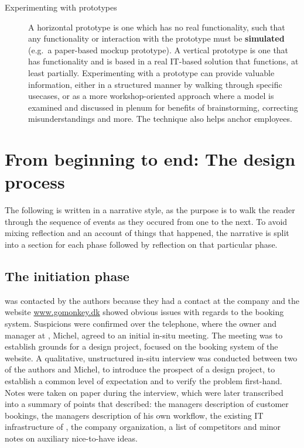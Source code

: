 \begin{description}
    \item [Experimenting with prototypes] A horizontal
        prototype\cite{bodker2004participatory} is one which has no real
        functionality, such that any functionality or interaction with the
        prototype must be \textbf{simulated} (e.g.\ a paper-based mockup
        prototype). A vertical prototype\cite{bodker2004participatory} is one
        that has functionality and is based in a real IT-based solution that
        functions, at least partially. Experimenting with a prototype can
        provide valuable information, either in a structured manner by walking
        through specific usecases, or as a more workshop-oriented approach where
        a model is examined and discussed in plenum for benefits of
        brainstorming, correcting misunderstandings and more. The technique also
        helps anchor employees.
\end{description}

\section{From beginning to end: The design process} \label{sec:process}
The following is written in a narrative style, as the purpose is to
walk the reader through the sequence of events as they occured from one
to the next. To avoid mixing reflection and an account of things that happened,
the narrative is split into a section for each phase followed by reflection on
that particular phase.

\subsection{The initiation phase}
\gomonkey{} was contacted by the authors because they had a contact at the
company and the website \url{www.gomonkey.dk} showed obvious issues with
regards to the booking system. Suspicions were confirmed over the telephone,
where the owner and manager at \gomonkey{}, Michel, agreed to an initial in-situ
meeting. The meeting was to establish grounds for a design project, focused on
the booking system of the \gomonkey{} website. A qualitative, unstructured
in-situ interview was conducted between two of the authors and Michel, to
introduce the prospect of a design project, to establish a common level of
expectation and to verify the problem first-hand. Notes were taken on paper
during the interview, which were later transcribed into a summary of points that
described: the managers description of customer bookings, the managers
description of his own workflow, the existing IT infrastructure of \gomonkey{},
the company organization, a list of competitors and minor notes on auxiliary
nice-to-have ideas.

